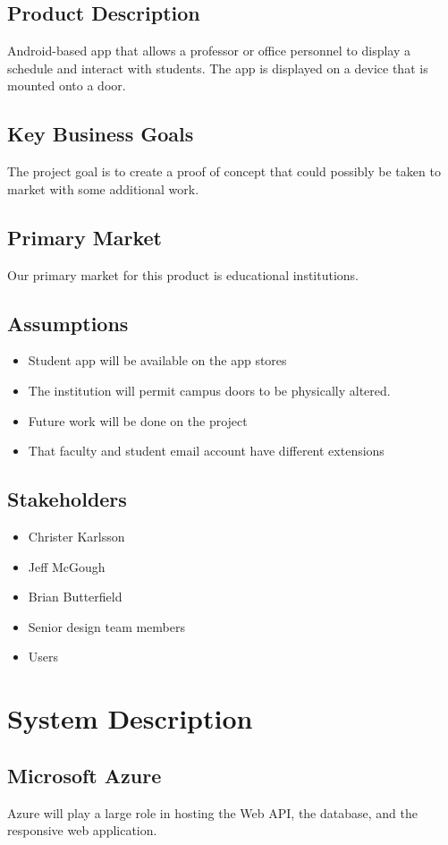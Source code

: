 \subsection*{Product Description}
Android-based app that allows a professor or office personnel to display a schedule and interact with students. The app is displayed on a device that is mounted onto a door. 
\subsection*{Key Business Goals }
The project goal is to create a proof of concept that could possibly be taken to market with some additional work. 
\subsection*{Primary Market} 
Our primary market for this product is educational institutions.
\subsection*{Assumptions} 
\begin{itemize}
\item Student app will be available on the app stores
\item The institution will permit campus doors to be physically altered.
\item Future work will be done on the project
\item That faculty and student email account have different extensions 
\end{itemize}
\subsection*{Stakeholders}
\begin{itemize}
\item Christer Karlsson
\item Jeff McGough
\item Brian Butterfield
\item Senior design team members
\item Users
\end{itemize} 

\section{System Description}

\subsection{Microsoft Azure}
Azure will play a large role in hosting the Web API, the database, and the responsive web application.

